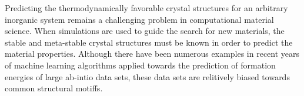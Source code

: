 

Predicting the thermodynamically favorable crystal structures for an arbitrary inorganic system remains a challenging problem in computational material science.
%
%
When simulations are used to guide the search for new materials, the stable and meta-stable crystal structures must be known in order to predict the material properties.
Although there have been numerous examples in recent years of machine learning algorithms applied towards the prediction of formation energies of large ab-intio data sets, these data sets are relitively biased towards common structural motiffs.




